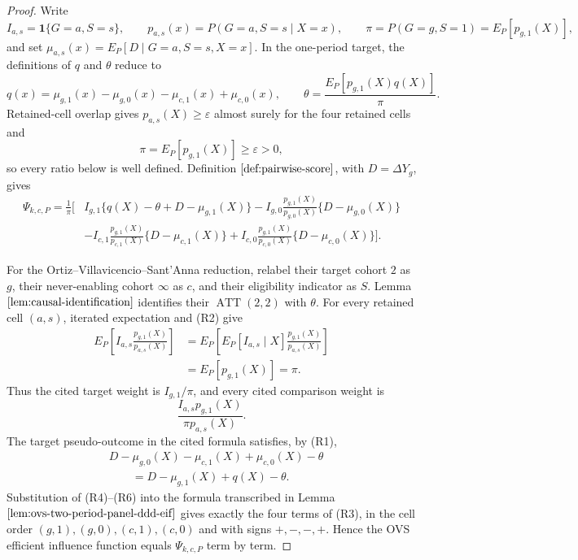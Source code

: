 \documentclass{article}
\begin{document}
\begin{proof}
Write
\[
I_{a,s}=\mathbf 1\{G=a,S=s\},\qquad
p_{a,s}(x)=P(G=a,S=s\mid X=x),\qquad
\pi=P(G=g,S=1)=E_P[p_{g,1}(X)],
\]
and set \(\mu_{a,s}(x)=E_P[D\mid G=a,S=s,X=x]\).  In the one-period target, the definitions of \(q\) and \(\theta\) reduce to
\[
q(x)=\mu_{g,1}(x)-\mu_{g,0}(x)-\mu_{c,1}(x)+\mu_{c,0}(x),
\qquad
\theta=\frac{E_P[p_{g,1}(X)q(X)]}{\pi}.
\tag{R1}
\]
Retained-cell overlap gives \(p_{a,s}(X)\ge\varepsilon\) almost surely for the four retained cells and
\[
\pi=E_P[p_{g,1}(X)]\ge\varepsilon>0,
\tag{R2}
\]
so every ratio below is well defined.  Definition \(\ref{def:pairwise-score}\), with \(D=\Delta Y_g\), gives
\[
\begin{aligned}
\Psi_{k,c,P}
=\frac1\pi\bigg[&I_{g,1}\{q(X)-\theta+D-\mu_{g,1}(X)\}
-I_{g,0}\frac{p_{g,1}(X)}{p_{g,0}(X)}\{D-\mu_{g,0}(X)\}\\
&-I_{c,1}\frac{p_{g,1}(X)}{p_{c,1}(X)}\{D-\mu_{c,1}(X)\}
+I_{c,0}\frac{p_{g,1}(X)}{p_{c,0}(X)}\{D-\mu_{c,0}(X)\}\bigg].
\end{aligned}
\tag{R3}
\]

For the Ortiz--Villavicencio--Sant'Anna reduction, relabel their target cohort \(2\) as \(g\), their never-enabling cohort \(\infty\) as \(c\), and their eligibility indicator as \(S\).  Lemma \(\ref{lem:causal-identification}\) identifies their \(\operatorname{ATT}(2,2)\) with \(\theta\).  For every retained cell \((a,s)\), iterated expectation and (R2) give
\[
\begin{aligned}
E_P\!\left[I_{a,s}\frac{p_{g,1}(X)}{p_{a,s}(X)}\right]
&=E_P\!\left[E_P[I_{a,s}\mid X]
\frac{p_{g,1}(X)}{p_{a,s}(X)}\right]\\
&=E_P[p_{g,1}(X)]=\pi.
\end{aligned}
\tag{R4}
\]
Thus the cited target weight is \(I_{g,1}/\pi\), and every cited comparison weight is
\[
\frac{I_{a,s}p_{g,1}(X)}{\pi p_{a,s}(X)}.
\tag{R5}
\]
The target pseudo-outcome in the cited formula satisfies, by (R1),
\[
\begin{aligned}
&D-\mu_{g,0}(X)-\mu_{c,1}(X)+\mu_{c,0}(X)-\theta\\
&\qquad=D-\mu_{g,1}(X)+q(X)-\theta.
\end{aligned}
\tag{R6}
\]
Substitution of (R4)--(R6) into the formula transcribed in Lemma \(\ref{lem:ovs-two-period-panel-ddd-eif}\) gives exactly the four terms of (R3), in the cell order \((g,1),(g,0),(c,1),(c,0)\) and with signs \(+,-,-,+\).  Hence the OVS efficient influence function equals \(\Psi_{k,c,P}\) term by term.


\end{proof}
\end{document}
